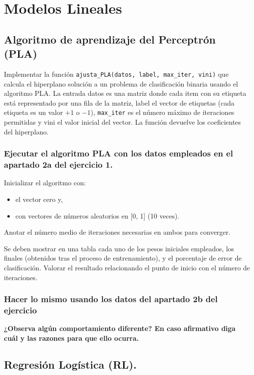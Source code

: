 \chapter{Modelos Lineales}

\section{Algoritmo de aprendizaje del Perceptrón (PLA)}

Implementar la función 
\texttt{ajusta_PLA(datos, label, max_iter, vini)} 
que calcula el  hiperplano solución a un problema de clasificación binaria
usando el algoritmo PLA. La entrada datos es una matriz donde cada item con su
etiqueta está representado por una fila de la matriz, label el vector de
etiquetas (cada etiqueta es un valor $+1$ o $-1$), \texttt{max_iter}
es el número máximo de iteraciones permitidas y vini el valor inicial del vector.
La función devuelve los coeficientes del hiperplano.

\subsection{Ejecutar el algoritmo PLA con los datos empleados en el apartado 2a del
ejercicio 1.}

Inicializar el algoritmo con: 

\begin{itemize}
\item el vector cero y, 
\item con vectores de números aleatorios en [0, 1] (10 veces).
\end{itemize}

Anotar el número medio de iteraciones necesarias en ambos para converger.

Se deben mostrar en una tabla cada uno de los pesos iniciales empleados, los
finales (obtenidos tras el proceso de entrenamiento), y el porcentaje de error
de clasificación. Valorar el resultado relacionando el punto de inicio con el
número de iteraciones.

\subsection{Hacer lo mismo usando los datos del apartado 2b del ejercicio}

\textbf{¿Observa algún comportamiento diferente? En caso afirmativo diga cuál y las
razones para que ello ocurra.}

\section{Regresión Logística (RL).}

